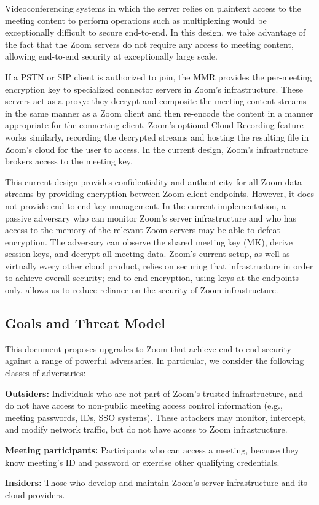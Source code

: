 Videoconferencing systems in which the server relies on plaintext access to the meeting content to perform operations such as multiplexing would be exceptionally difficult to secure end-to-end. In this design, we take advantage of the fact that the Zoom servers do not require any access to meeting content, allowing end-to-end security at exceptionally large scale. 

If a PSTN or SIP client is authorized to join, the MMR provides the per-meeting encryption key to specialized connector servers in Zoom's infrastructure. These servers act as a proxy: they decrypt and composite the meeting content streams in the same manner as a Zoom client and then re-encode the content in a manner appropriate for the connecting client. Zoom's optional Cloud Recording feature works similarly, recording the decrypted streams and hosting the resulting file in Zoom's cloud for the user to access. In the current design, Zoom's infrastructure brokers access to the meeting key.

This current design provides confidentiality and authenticity for all Zoom data streams by providing
encryption between Zoom client endpoints. However, it does not provide end-to-end key
management. In the current implementation, a passive adversary who can monitor Zoom's server
infrastructure and who has access to the memory of the relevant Zoom servers may be able to defeat
encryption. The adversary can observe the shared meeting key (MK), derive session keys, and decrypt
all meeting data. Zoom's current setup, as well as virtually every other cloud product, relies on
securing that infrastructure in order to achieve overall security; end-to-end encryption, using keys
at the endpoints only, allows us to reduce reliance on the security of Zoom infrastructure.

\subsection{Goals and Threat Model}
This document proposes upgrades to Zoom that achieve end-to-end security against a range of powerful adversaries. In particular, we consider the following classes of adversaries:

\begin{description}
	\item {\bf Outsiders:} Individuals who are not part of Zoom's trusted infrastructure, and do not have access to non-public meeting access control information  (e.g., meeting passwords, IDs, SSO systems). These attackers may monitor, intercept, and modify network traffic, but do not have access to Zoom infrastructure.
	\item {\bf Meeting participants:} Participants who can access a meeting, because they know meeting's ID and password or exercise other qualifying credentials.
	\item {\bf Insiders:} Those who develop and maintain Zoom's server infrastructure and its cloud providers.
\end{description}

